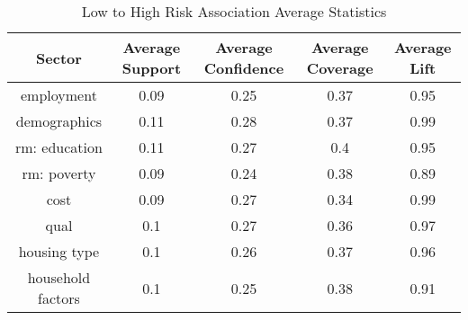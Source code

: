 \begin{table}[h]
    \centering
    \caption{Low to High Risk Association Average Statistics}
    \label{tab:low_high_risk}
    \begin{tabular}{|c|c|c|c|c|}
    \hline
    Sector & Average Support & Average Confidence & Average Coverage & Average Lift \\
    \hline
    employment & 0.09 & 0.25 & 0.37 & 0.95 \\
    demographics & 0.11 & 0.28 & 0.37 & 0.99 \\
    rm: education & 0.11 & 0.27 & 0.4 & 0.95 \\
    rm: poverty & 0.09 & 0.24 & 0.38 & 0.89 \\
    cost & 0.09 & 0.27 & 0.34 & 0.99 \\
    qual & 0.1 & 0.27 & 0.36 & 0.97 \\
    housing type & 0.1 & 0.26 & 0.37 & 0.96 \\
    household factors & 0.1 & 0.25 & 0.38 & 0.91 \\
    \hline
    \end{tabular}

    \end{table}